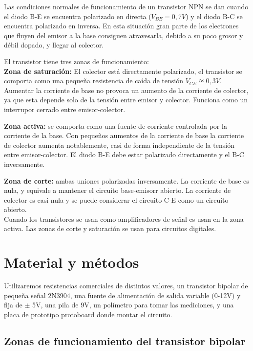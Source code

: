 \documentclass[a4paper,12pt,spanish]{article}
\begin{document}
Las condiciones normales de funcionamiento de un transistor NPN se dan cuando el diodo B-E se encuentra polarizado en directa ($V_{BE} = 0,7 \si{V}$) y el diodo B-C se encuentra polarizado en inversa.
En esta situación gran parte de los electrones que fluyen del emisor a la base consiguen atravesarla, debido a su poco grosor y débil dopado, y llegar al colector.

El transistor tiene tres zonas de funcionamiento:\\

\textbf{Zona de saturación: } El colector está directamente polarizado, el transistor se comporta como una pequeña resistencia de caída de tensión $V_{CE}\approxeq 0,3 \si{V}$. Aumentar la corriente de base no provoca un aumento de la corriente de colector, ya que esta depende solo de la tensión entre emisor y colector. Funciona como un interrupor cerrado entre emisor-colector.

\textbf{Zona activa:} se comporta como una fuente de corriente controlada por la corriente de la base. Con pequeños aumentos de la corriente de base la corriente de colector aumenta notablemente, casi de forma independiente de la tensión entre emisor-colector. El diodo B-E debe estar polarizado directamente y el B-C inversamente.

\textbf{Zona de corte:} ambas uniones polarizadas inversamente. La corriente de base es nula, y equivale a mantener el circuito base-emisorr abierto. La corriente de colector es casi nula y se puede considerar el circuito C-E como un circuito abierto.\\

Cuando los transistores se usan como amplificadores de señal es usan en la zona activa. Las zonas de corte y saturación se usan para circuitos digitales.


\section{Material y métodos}

Utilizaremos resistencias comerciales de distintos valores, un transistor bipolar de pequeña señal 2N3904, una fuente de alimentación de salida variable (0-12V) y fija de $\pm$ 5V, una pila de 9V, un polímetro para tomar las mediciones, y una placa de prototipo protoboard donde montar el circuito.

\subsection{Zonas de funcionamiento del transistor bipolar}
\end{document}
